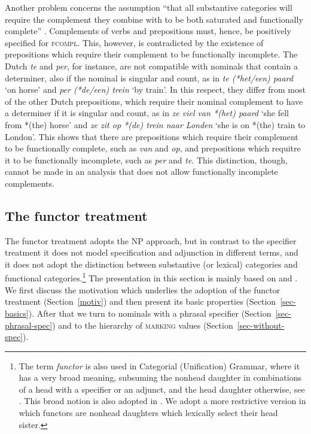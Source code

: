 \documentclass[output=paper
                ,modfonts
                ,nonflat
	        ,collection
	        ,collectionchapter
	        ,collectiontoclongg
 	        ,biblatex
                ,babelshorthands
                ,newtxmath
                ,draftmode
                ,colorlinks, citecolor=brown
]{./langsci/langscibook}
\begin{document}
Another problem concerns the assumption ``that all substantive categories will 
require the complement they combine with to be both saturated and 
functionally complete'' \citep[311]{Netter94}. Complements of verbs and 
prepositions must, hence, be positively specified for \textsc{fcompl}. 
This, however, is contradicted by the existence of 
prepositions which require their complement to be functionally incomplete.
The Dutch \emph{te} and \emph{per}, for instance, are not compatible with nominals 
that contain a determiner, also if the nominal is singular and count, 
as in \emph{te (*het/een) paard} `on horse' and \emph{per (*de/een) trein} `by train'.   
In this respect, they differ from most of the other Dutch prepositions, which 
require their nominal complement to have a determiner if it is singular and count,   
as in \emph{ze viel van *(het) paard} `she fell from *(the) horse' 
and \emph{ze zit op *(de) trein naar Londen} `she is on *(the) train to London'.  
This shows that there are prepositions which require their complement to be 
functionally complete, such as \emph{van} and \emph{op}, 
and prepositions which requitre it to be functionally incomplete, such as 
\emph{per} and \emph{te}. This distinction, though, cannot be made in 
an analysis that does not allow functionally incomplete complements. 


\subsection{The functor treatment} 
\label{funct}


The functor treatment adopts the NP approach, but in contrast to the specifier treatment 
it does not model specification and adjunction in different terms, and it does not adopt 
the distinction between substantive (or lexical) categories and functional 
categories.\footnote{The term \emph{functor} is also used in Categorial (Unification) Grammar, 
where it has a very broad meaning, subsuming the nonhead daughter in combinations of a 
head with a specifier or an adjunct, and the head daughter otherwise, 
see \citet{Bouma88}. This broad notion is also adopted in 
\citet{Reape94}. We adopt a more restrictive version in which functors 
are nonhead daughters which lexically select their head sister.}  
The presentation in this section is mainly based on \citet{VanEynde06} 
and \citet{Allegranza06}. We first discuss the motivation which underlies the adoption 
of the functor treatment (Section~\ref{motiv}) and then present its basic
properties (Section~\ref{sec-basics}). After that we turn to nominals with a 
phrasal specifier (Section~\ref{sec-phrasal-spec}) 
and to the hierarchy of \textsc{marking} values (Section~\ref{sec-without-spec}).    
\end{document}
